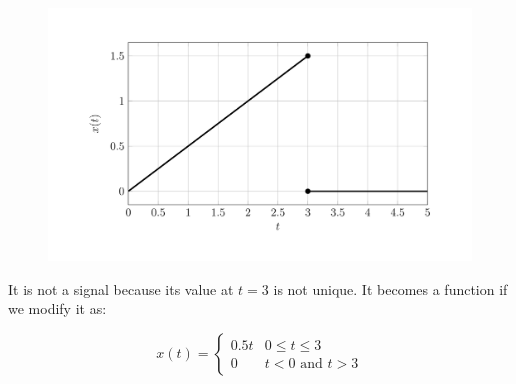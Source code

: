 \documentclass[12pt]{article}
\begin{document}
\begin{figure}
	\begin{center}
		\includegraphics{../latex/chapter_2/plot_2-5.svg}
	\end{center}
\end{figure}

It is not a signal because its value at $t=3$ is not unique. It becomes a function if we modify it as:

\[
	x(t)=
	\begin{cases}
		0.5t & 0\le t \le 3                   \\
		0    & t \lt 0 \textrm{ and } t \gt 3
	\end{cases}
\]
\end{document}
